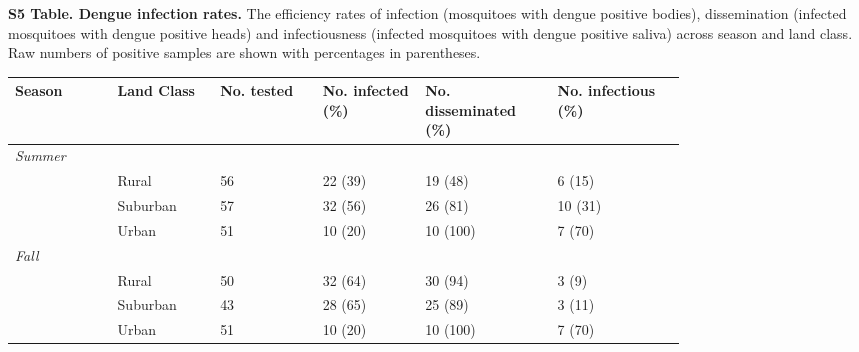 \documentclass[12pt]{article}
\begin{document}
\begin{landscape}

	\begin{table}[h]
	\centering
	\textbf{S5 Table. Dengue infection rates.} The efficiency rates of infection (mosquitoes with dengue positive bodies), dissemination (infected mosquitoes with dengue positive heads) and infectiousness (infected mosquitoes with dengue positive saliva) across season and land class. Raw numbers of positive samples are shown with percentages in parentheses.
	\begin{tabular}{P{0.12\linewidth}P{0.12\linewidth}P{0.12\linewidth}P{0.12\linewidth}P{0.15\linewidth}P{0.15\linewidth}}
	\hline
	\textbf{Season} & \textbf{Land Class} & \textbf{No. tested} & \textbf{No. infected (\%)}  & \textbf{No. disseminated (\%)} & \textbf{No. infectious (\%)} \\
	\hline
	\hline
	\textit{Summer} &   &   &   &   \\
	     & Rural & 56 & 22 (39) & 19 (48) & 6 (15) \\
	   & Suburban & 57 & 32 (56) & 26 (81) & 10 (31) \\
	   & Urban & 51 & 10 (20) & 10 (100) & 7 (70) \\

	\textit{Fall} &   &   &   &   \\
	     & Rural & 50 & 32 (64) & 30 (94) & 3 (9) \\
	   & Suburban & 43 & 28 (65) & 25 (89) & 3 (11) \\
	   & Urban & 51 & 10 (20) & 10 (100) & 7 (70) \\
	\hline
	\end{tabular}
	\end{table}

\end{landscape}
\end{document}
